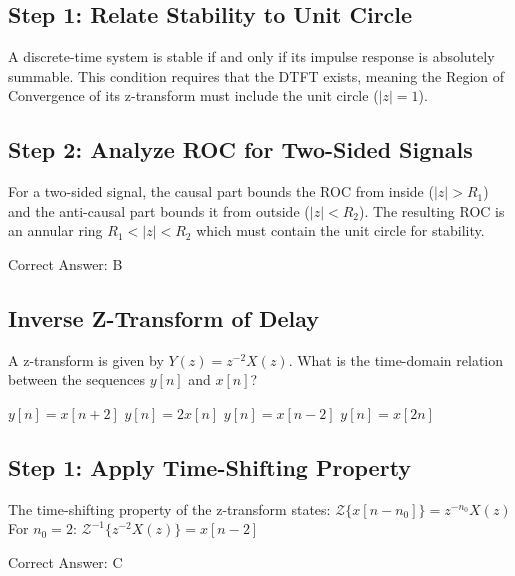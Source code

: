 \begin{solution}

\subsection*{Step 1: Relate Stability to Unit Circle}
A discrete-time system is stable if and only if its impulse response is absolutely summable. This condition requires that the DTFT exists, meaning the Region of Convergence of its z-transform must include the unit circle ($|z| = 1$).

\subsection*{Step 2: Analyze ROC for Two-Sided Signals}
For a two-sided signal, the causal part bounds the ROC from inside ($|z| > R_1$) and the anti-causal part bounds it from outside ($|z| < R_2$). The resulting ROC is an annular ring $R_1 < |z| < R_2$ which must contain the unit circle for stability.

Correct Answer: B
\end{solution}

\clearpage

\subsection{Inverse Z-Transform of Delay}

A z-transform is given by $Y(z) = z^{-2} X(z)$. What is the time-domain relation between the sequences $y[n]$ and $x[n]$?

\begin{choices}
    \choice $y[n] = x[n+2]$
    \choice $y[n] = 2 x[n]$
    \correctchoice $y[n] = x[n-2]$
    \choice $y[n] = x[2n]$
\end{choices}

\begin{solution}

\subsection*{Step 1: Apply Time-Shifting Property}
The time-shifting property of the z-transform states:
$\mathcal{Z}\{x[n - n_0]\} = z^{-n_0} X(z)$
For $n_0 = 2$:
$\mathcal{Z}^{-1}\{z^{-2} X(z)\} = x[n - 2]$

Correct Answer: C
\end{solution}

\clearpage

